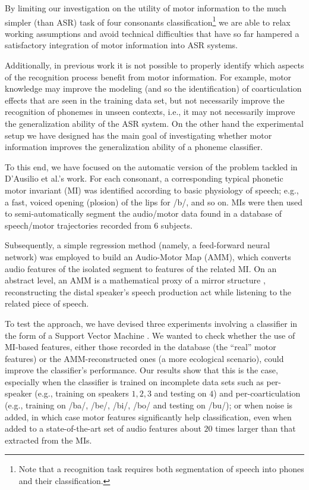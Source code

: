 
By limiting our investigation on the utility of motor information to the much simpler (than ASR) task of four consonants classification\footnote{Note that a recognition task requires both segmentation of speech into phones and their classification.} we are able to relax working assumptions and avoid technical difficulties that have so far hampered a satisfactory integration of motor information into ASR systems. 

Additionally, in previous work it is not possible to properly identify which aspects of the recognition process benefit from motor information. For example, motor knowledge may improve the modeling (and so the identification) of coarticulation effects that are seen in the training data set, but not necessarily improve the recognition of phonemes in unseen contexts, i.e., it may not necessarily improve the generalization ability of the ASR system. On the other hand the experimental setup we have designed has the main goal of investigating whether motor information improves the generalization ability of a phoneme classifier.  


To this end, we have focused on the automatic version of
the problem tackled in D'Ausilio et al.'s work. For each consonant,
a corresponding typical phonetic motor invariant (MI) was
identified according to basic physiology of speech;
e.g., a fast, voiced opening (plosion) of the lips for /b/, and so on.
MIs were then used to semi-automatically segment the audio/motor data found in a
database of speech/motor trajectories recorded from $6$ subjects.

Subsequently, a simple regression method (namely, a feed-forward neural network) was employed
to build an Audio-Motor Map (AMM), which converts audio features of the isolated segment to
features of the related MI. On an abstract level, an AMM is a mathematical proxy of a mirror
structure \cite{umilta-01}, reconstructing the distal speaker's speech production act while
listening to the related piece of speech.

To test the approach, we have devised three experiments involving a 
classifier in the form of a Support Vector Machine \cite{BGV92}. We wanted to check whether
the use of MI-based features, either those recorded in the database (the ``real''
motor features) or the AMM-reconstructed ones (a more ecological scenario),
could improve the classifier's performance. Our results show that this is the case,
especially when the classifier is trained on incomplete data sets such as 
per-speaker (e.g., training on speakers $1,2,3$ and testing on $4$) and
per-coarticulation (e.g., training on /ba/, /be/, /bi/, /bo/ and testing on /bu/); or when noise is added,
in which case motor features significantly help classification, even when added to a
state-of-the-art set of audio features about $20$ times larger than that extracted
from the MIs.

